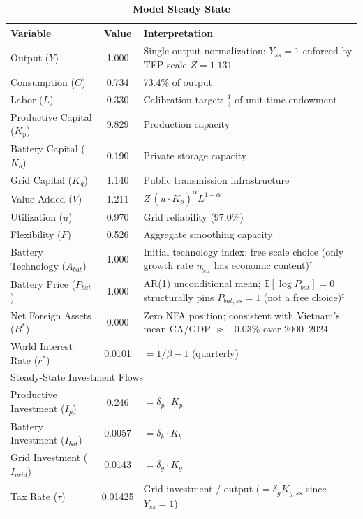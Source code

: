 \begin{table}[H]
		\centering
		\caption[Model Steady State]{\textbf{Model Steady State}}
		\label{tab:steady_state}
		\renewcommand{\arraystretch}{1.3}
		\begin{tabular}{l c p{6.5cm}}
			\toprule
			\textbf{Variable} & \textbf{Value} & \textbf{Interpretation} \\
			\midrule
			Output ($Y$) & 1.000 & Single output normalization: $Y_{ss}=1$ enforced by TFP scale $Z=1.131$ \\
			Consumption ($C$) & 0.734 & 73.4\% of output \\
			Labor ($L$) & 0.330 & Calibration target: $\tfrac{1}{3}$ of unit time endowment \\
			Productive Capital ($K_p$) & 9.829 & Production capacity \\
			Battery Capital ($K_b$) & 0.190 & Private storage capacity \\
			Grid Capital ($K_g$) & 1.140 & Public transmission infrastructure \\
			Value Added ($V$) & 1.211 & $Z\,(u \cdot K_p)^\alpha L^{1-\alpha}$ \\
			Utilization ($u$) & 0.970 & Grid reliability (97.0\%) \\
			Flexibility ($F$) & 0.526 & Aggregate smoothing capacity \\
			Battery Technology ($A_{bat}$) & 1.000 & Initial technology index; free scale choice (only growth rate $\eta_{bat}$ has economic content)$^{\ddagger}$ \\
			Battery Price ($P_{bat}$) & 1.000 & AR(1) unconditional mean; $\mathbb{E}[\log P_{bat}]=0$ structurally pins $P_{bat,ss}=1$ (not a free choice)$^{\ddagger}$ \\
			Net Foreign Assets ($B^*$) & 0.000 & Zero NFA position; consistent with Vietnam's mean CA/GDP $\approx -0.03\%$ over 2000--2024 \\
			World Interest Rate ($r^*$) & 0.0101 & $= 1/\beta - 1$ (quarterly) \\
			\midrule
			\multicolumn{3}{l}{Steady-State Investment Flows} \\
			Productive Investment ($I_p$) & 0.246 & $= \delta_p \cdot K_p$ \\
			Battery Investment ($I_{bat}$) & 0.0057 & $= \delta_b \cdot K_b$ \\
			Grid Investment ($I_{grid}$) & 0.0143 & $= \delta_g \cdot K_g$ \\
			Tax Rate ($\tau$) & 0.01425 & Grid investment / output ($=\delta_g K_{g,ss}$ since $Y_{ss}=1$) \\

\end{tabular}
\end{table}

